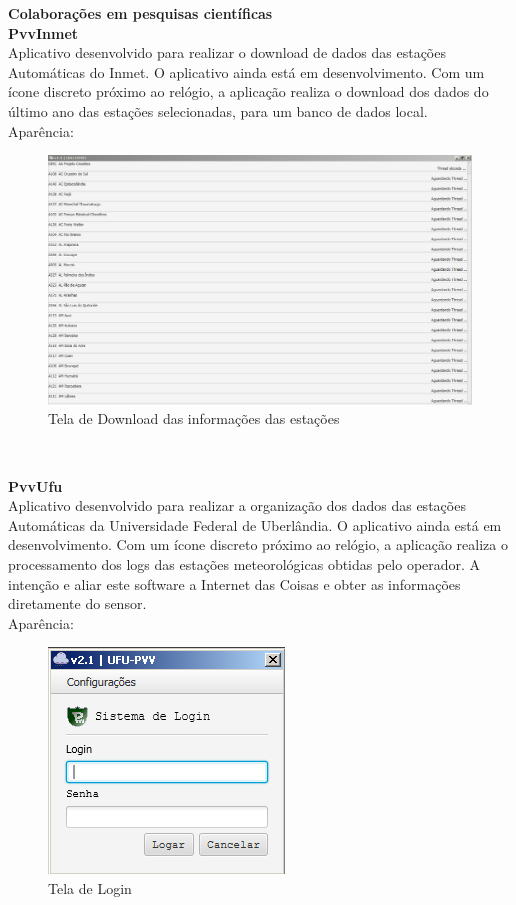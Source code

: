 \documentclass[12pt,a4paper,oneside,sumario=tradicional,brazil]{abntex2}
\begin{document}
	\textbf{{\Large Colaborações em pesquisas científicas}} \\
	\indent
	\textbf{{\large PvvInmet}} \\
	\indent
	Aplicativo desenvolvido para realizar o download de dados das estações Automáticas do Inmet. O aplicativo ainda está em desenvolvimento. Com um ícone discreto próximo ao relógio, a aplicação realiza o download dos dados do último ano das estações selecionadas, para um banco de dados local. \\
	\indent
	Aparência: \\
	\begin{figure}[H]
		\centering
		\includegraphics[width=0.9\linewidth]{imgs/pvvinmet-principal.PNG}
		\caption{Tela de Download das informações das estações}
	\end{figure}
	
	\
	
	\indent
	\textbf{{\large PvvUfu}} \\
	\indent
	Aplicativo desenvolvido para realizar a organização dos dados das estações Automáticas da Universidade Federal de Uberlândia. O aplicativo ainda está em desenvolvimento. Com um ícone discreto próximo ao relógio, a aplicação realiza o processamento dos logs das estações meteorológicas obtidas pelo operador. A intenção e aliar este software a Internet das Coisas e obter as informações diretamente do sensor. \\
	\indent
	Aparência: \\
		\begin{figure}[H]
			\centering
			\includegraphics[width=0.25\linewidth]{imgs/pvvufu-tela-de-login.PNG}
			\caption{Tela de Login}
		\end{figure}
	
\end{document}
